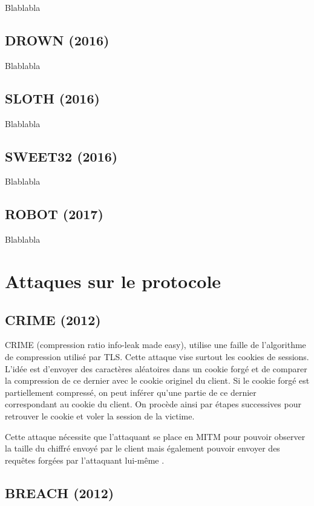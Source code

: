 Blablabla \cite{logjam}

\subsection{DROWN (2016)}

Blablabla \cite{drown}

\subsection{SLOTH (2016)}

Blablabla \cite{sloth}

\subsection{SWEET32 (2016)}

Blablabla \cite{sweet32}

\subsection{ROBOT (2017)}

Blablabla \cite{robot}

\section{Attaques sur le protocole}

\subsection{CRIME (2012)}

CRIME (compression ratio info-leak made easy), utilise une faille de l'algorithme de compression utilisé par TLS. Cette attaque vise surtout les cookies de sessions. L'idée est d'envoyer des caractères aléatoires dans un cookie forgé et de comparer la compression de ce dernier avec le cookie originel du client. Si le cookie forgé est partiellement compressé, on peut inférer qu'une partie de ce dernier correspondant au cookie du client. On procède ainsi par étapes successives pour retrouver le cookie et voler la session de la victime.

Cette attaque nécessite que l'attaquant se place en MITM pour pouvoir observer la taille du chiffré envoyé par le client mais également pouvoir envoyer des requêtes forgées par l'attaquant lui-même \cite{crime}.

\subsection{BREACH (2012)}

